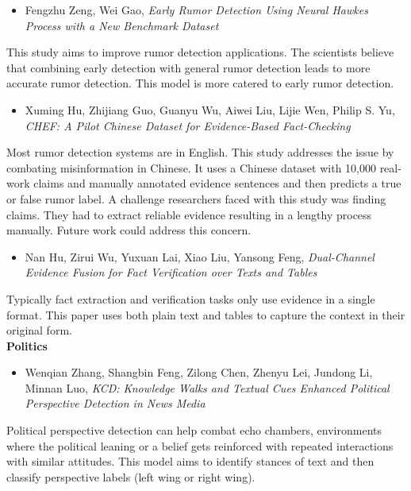 \documentclass[11pt]{article}
\begin{document}
\begin{itemize}
\item Fengzhu Zeng, Wei Gao, \emph{Early Rumor Detection Using Neural Hawkes Process with a New Benchmark Dataset}
\end{itemize}
This study aims to improve rumor detection applications. The scientists believe that combining early detection with general rumor detection leads to more accurate rumor detection. This model is more catered to early rumor detection.  

\begin{itemize}
\item Xuming Hu, Zhijiang Guo, Guanyu Wu, Aiwei Liu, Lijie Wen, Philip S. Yu, \emph{CHEF: A Pilot Chinese Dataset for Evidence-Based Fact-Checking}
\end{itemize}
Most rumor detection systems are in English. This study addresses the issue by combating misinformation in Chinese. It uses a Chinese dataset with 10,000 real-work claims and manually annotated evidence sentences and then predicts a true or false rumor label. A challenge researchers faced with this study was finding claims. They had to extract reliable evidence resulting in a lengthy process manually. Future work could address this concern. 

\begin{itemize}
\item Nan Hu, Zirui Wu, Yuxuan Lai, Xiao Liu, Yansong Feng, \emph{Dual-Channel Evidence Fusion for Fact Verification over Texts and Tables}
\end{itemize}
Typically fact extraction and verification tasks only use evidence in a single format. This paper uses both plain text and tables to capture the context in their original form. 
\\[12pt]
\noindent
\textbf{Politics}
\begin{itemize}
\item Wenqian Zhang, Shangbin Feng, Zilong Chen, Zhenyu Lei, Jundong Li, Minnan Luo, \emph{KCD: Knowledge Walks and Textual Cues Enhanced Political Perspective Detection in News Media}
\end{itemize}
Political perspective detection can help combat echo chambers, environments where the political leaning or a belief gets reinforced with repeated interactions with similar attitudes. This model aims to identify stances of text and then classify perspective labels (left wing or right wing). 
\end{document}
